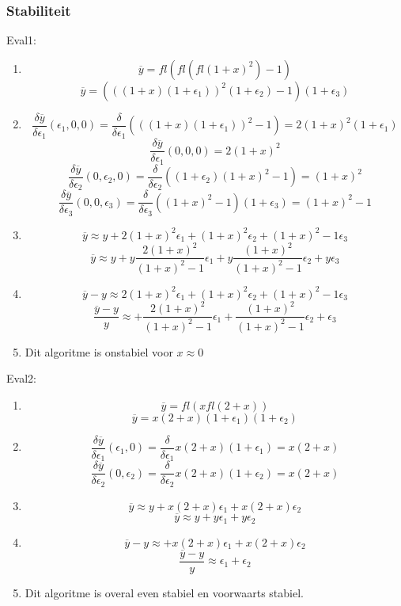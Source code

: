 \documentclass[12pt,a4paper]{article}
\begin{document}
\subsubsection{Stabiliteit}
Eval1:
\begin{enumerate}
\item
\[
\overline{y} = fl\left(fl\left(fl(1+x)^2\right)-1\right)
\]
\[
\overline{y} = (((1+x)(1+\epsilon_1))^2(1+\epsilon_2) - 1)(1+\epsilon_3)
\]

\item
\[
\frac{\delta\overline{y}}{\delta\epsilon_1}(\epsilon_1,0,0)
= \frac{\delta}{\delta\epsilon_1}(((1+x)(1+\epsilon_1))^2-1)
= 2(1+x)^2(1+\epsilon_1)
\]
\[
\frac{\delta\overline{y}}{\delta\epsilon_1}(0,0,0)
= 2(1+x)^2 
\]
\[
\frac{\delta\overline{y}}{\delta\epsilon_2}(0,\epsilon_2,0)
= \frac{\delta}{\delta\epsilon_2}((1+\epsilon_2)(1+x)^2-1)
= (1+x)^2 
\]
\[
\frac{\delta\overline{y}}{\delta\epsilon_3}(0,0,\epsilon_3)
= \frac{\delta}{\delta\epsilon_3}((1+x)^2-1)(1+\epsilon_3)
= (1+x)^2-1
\]

\item
\[
\overline{y} \approx y
+ 2(1+x)^2  \epsilon_1
+ (1+x)^2   \epsilon_2
+ (1+x)^2-1 \epsilon_3
\]
\[
\overline{y} \approx y
+ y\frac{2(1+x)^2}{(1+x)^2-1}  \epsilon_1
+ y\frac{(1+x)^2}{(1+x)^2-1}   \epsilon_2
+ y \epsilon_3
\]

\item
\[
\overline{y} - y \approx
  2(1+x)^2  \epsilon_1
+ (1+x)^2   \epsilon_2
+ (1+x)^2-1 \epsilon_3
\]
\[
\frac{\overline{y}-y}{y} \approx
+ \frac{2(1+x)^2}{(1+x)^2-1}  \epsilon_1
+ \frac{(1+x)^2}{(1+x)^2-1}   \epsilon_2
+ \epsilon_3
\]

\item
Dit algoritme is onstabiel voor $x\approx 0$

\end{enumerate}


Eval2:
\begin{enumerate}
\item
\[
\overline{y} = fl(xfl(2+x))
\]
\[
\overline{y} = x(2+x)(1+\epsilon_1)(1+\epsilon_2)
\]

\item
\[
\frac{\delta\overline{y}}{\delta\epsilon_1}(\epsilon_1,0)
= \frac{\delta}{\delta\epsilon_1} x(2+x)(1+\epsilon_1)
= x(2+x)
\]
\[
\frac{\delta\overline{y}}{\delta\epsilon_2}(0,\epsilon_2)
= \frac{\delta}{\delta\epsilon_2} x(2+x)(1+\epsilon_2)
= x(2+x)
\]

\item
\[
\overline{y} \approx y
+ x(2+x)\epsilon_1
+ x(2+x)\epsilon_2
\]
\[
\overline{y} \approx y
+ y\epsilon_1
+ y\epsilon_2
\]
\item
\[
\overline{y} -y \approx
+ x(2+x)\epsilon_1
+ x(2+x)\epsilon_2
\]
\[
\frac{\overline{y}-y}{y} \approx
\epsilon_1 + \epsilon_2
\]
\item
Dit algoritme is overal even stabiel en voorwaarts stabiel.
\end{enumerate}
\end{document}

